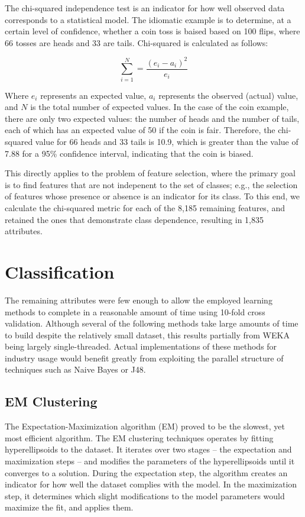 \documentclass[letterpaper, 10 pt, conference]{ieeeconf}  %
\begin{document}
The chi-squared independence test is an indicator for how well
observed data corresponds to a statistical model. The idiomatic
example is to determine, at a certain level of confidence, whether a
coin toss is baised based on 100 flips, where 66 tosses are heads and
33 are tails. Chi-squared is calculated as follows:

\[\sum_{i=1}^{N}=\frac{(e_i-a_i)^2}{e_i}\]

Where $e_i$ represents an expected value, $a_i$ represents the
observed (actual) value, and $N$ is the total number of expected
values. In the case of the coin example, there are only two expected
values: the number of heads and the number of tails, each of which has
an expected value of 50 if the coin is fair. Therefore, the
chi-squared value for 66 heads and 33 tails is 10.9, which is greater
than the value of 7.88 for a 95\% confidence interval, indicating that
the coin is biased.

This directly applies to the problem of feature selection, where the
primary goal is to find features that are not indepenent to the set of
classes; e.g., the selection of features whose presence or absence is
an indicator for its class. To this end, we calculate the chi-squared
metric for each of the 8,185 remaining features, and retained the
ones that demonstrate class dependence, resulting in 1,835 attributes.

\section{Classification}

The remaining attributes were few enough to allow the employed
learning methods to complete in a reasonable amount of time using
10-fold cross validation. Although several of the following methods
take large amounts of time to build despite the relatively small
dataset, this results partially from WEKA being largely
single-threaded. Actual implementations of these methods for industry
usage would benefit greatly from exploiting the parallel structure of
techniques such as Naive Bayes or J48.

\subsection{EM Clustering}

The Expectation-Maximization algorithm (EM) proved to be the slowest,
yet most efficient algorithm. The EM clustering techniques operates by
fitting hyperellipsoids to the dataset.  It iterates over two stages
-- the expectation and maximization steps -- and modifies the
parameters of the hyperellipsoids until it converges to a
solution. During the expectation step, the algorithm creates an
indicator for how well the dataset complies with the model. In the
maximization step, it determines which slight modifications to the
model parameters would maximize the fit, and applies them.
\end{document}
